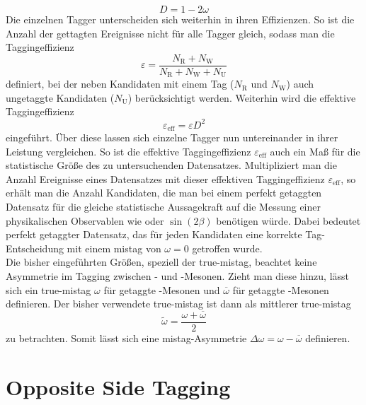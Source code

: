 \begin{equation}
D=1-2\omega
\end{equation}
Die einzelnen Tagger unterscheiden sich weiterhin in ihren Effizienzen. So ist die Anzahl der gettagten Ereignisse nicht für alle Tagger gleich, sodass  man die Taggingeffizienz
\begin{equation}
\varepsilon=\frac{N_{\text{R}}+N_{\text{W}}}{N_{\text{R}}+N_{\text{W}}+N_{\text{U}}}
\end{equation}
definiert, bei der neben Kandidaten mit einem Tag ($N_\text{R}$ und $N_\text{W}$) auch ungetaggte Kandidaten ($N_\text{U}$) berücksichtigt werden. Weiterhin wird die effektive Taggingeffizienz
\begin{equation}
\varepsilon_\text{eff}=\varepsilon D^2
\end{equation}
eingeführt. Über diese lassen sich einzelne Tagger nun untereinander in ihrer Leistung vergleichen. So ist die effektive Taggingeffizienz $\varepsilon_\text{eff}$ auch ein Maß für die statistische Größe des zu untersuchenden Datensatzes. Multipliziert man die Anzahl Ereignisse eines Datensatzes mit dieser effektiven Taggingeffizienz $\varepsilon_\text{eff}$, so erhält man die Anzahl Kandidaten, die man bei einem perfekt getaggten Datensatz für die gleiche statistische Aussagekraft auf die Messung einer physikalischen Observablen wie \dmd oder $\sin\left(2\beta\right)$ benötigen würde. Dabei bedeutet perfekt getaggter Datensatz, das für jeden Kandidaten eine korrekte Tag-Entscheidung mit einem mistag von $\omega=0$ getroffen wurde.\\
Die bisher eingeführten Größen, speziell der true-mistag, beachtet keine Asymmetrie im Tagging zwischen \Bz- und \Bzb-Mesonen. Zieht man diese hinzu, lässt sich ein true-mistag $\omega$ für getaggte \Bz-Mesonen und $\overline{\omega}$ für getaggte \Bzb-Mesonen definieren. Der bisher verwendete true-mistag ist dann als mittlerer true-mistag 
\begin{equation}
\widetilde{\omega}=\frac{\omega+\overline{\omega}}{2}
\end{equation}
zu betrachten. Somit lässt sich eine mistag-Asymmetrie $\Delta\omega=\omega-\overline{\omega}$ definieren.

\section{Opposite Side Tagging}\label{sec:ostagging}

